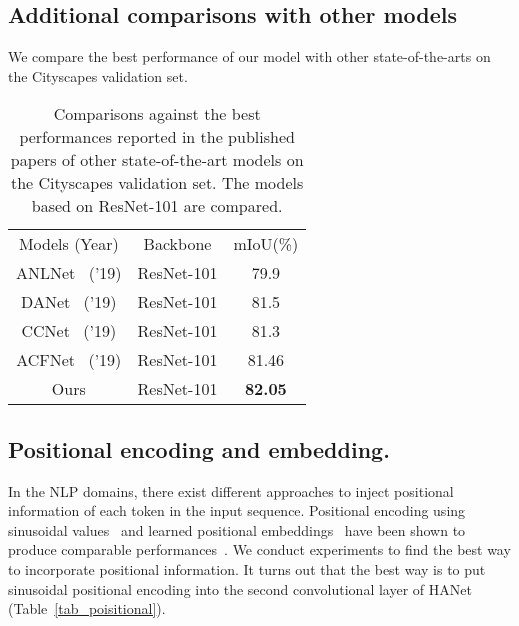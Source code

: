 \documentclass[10pt,twocolumn,letterpaper]{article}
\newcommand{\drule}{\specialrule{0.2pt}{1pt}{1pt}\specialrule{0.2pt}{0pt}{\belowrulesep}}
\begin{document}
\subsection{Additional comparisons with other models} \label{app:1_comparison}
\vspace*{-0.1cm}
We compare the best performance of our model with other state-of-the-arts on the Cityscapes validation set.

\begin{table}[!h]
\vspace{-0.1cm}
\begin{center}
\footnotesize
\setlength\tabcolsep{10pt}
\begin{tabular}{c|c|c}
\toprule
Models (Year) & Backbone & mIoU(\%) \\
\drule
ANLNet~\cite{zhu2019asymmetric} ('19) & ResNet-101 & 79.9 \\
\midrule
DANet~\cite{fu2019dual} ('19) & ResNet-101 & 81.5 \\
\midrule
CCNet~\cite{huang2019ccnet} ('19) & ResNet-101 &  81.3 \\
\midrule
ACFNet~\cite{zhang2019acfnet} ('19) & ResNet-101 &  81.46 \\
\drule
Ours & ResNet-101 & \textbf{82.05} \\
\bottomrule
\end{tabular}
\end{center}
\vspace*{-0.5cm}
\caption{Comparisons against the best performances reported in the published papers of other state-of-the-art models on the Cityscapes validation set. The models based on ResNet-101 are compared.}
\label{tab_val_comparisons}
\vspace*{-0.4cm}
\end{table}



\subsection{Positional encoding and embedding.} \label{app:position}
\vspace*{-0.1cm}
In the NLP domains, there exist different approaches to inject positional information of each token in the input sequence. Positional encoding using sinusoidal values~\cite{vaswani2017attention} and learned positional embeddings~\cite{gehring2017convolutional} have been shown to produce comparable performances~\cite{vaswani2017attention}. We conduct experiments to find the best way to incorporate positional information. It turns out that the best way is to put sinusoidal positional encoding into the second convolutional layer of HANet (Table~\ref{tab_poisitional}).
\end{document}
